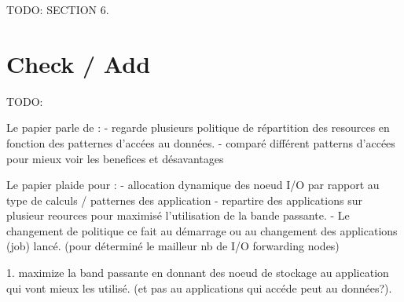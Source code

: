 \documentclass[10pt, a4paper]{article}
\begin{document}
TODO: SECTION 6.

\section{Check / Add}

TODO:

Le papier parle de :
- regarde plusieurs politique de répartition des resources en fonction des patternes d'accées au données.
- comparé différent patterns d'accées pour mieux voir les benefices et désavantages

Le papier plaide pour :
- allocation dynamique des noeud I/O par rapport au type de calculs / patternes des application
- repartire des applications sur plusieur reources pour maximisé l'utilisation de la bande passante.
- Le changement de politique ce fait au démarrage ou au changement des applications (job) lancé. (pour déterminé le mailleur nb de I/O forwarding nodes)

1. maximize la band passante en donnant des noeud de stockage au application qui vont mieux les utilisé. (et pas au applications qui accéde peut au données?).


\nocite{*}
\end{document}
